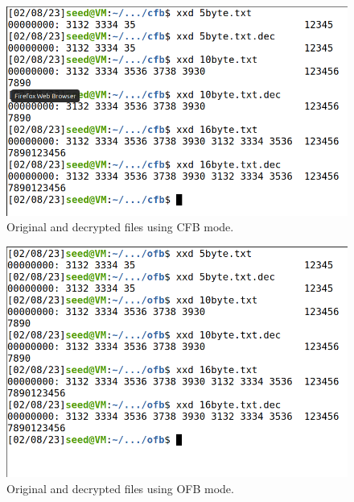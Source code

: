\begin{figure}
    \centering
    \includegraphics[height=\textheight,width=\textwidth,keepaspectratio]
    {figures/padding_cfb.png}
    \caption{Original and decrypted files using CFB mode.}\label{fig:padding_cfb}
\end{figure}

\begin{figure}
    \centering
    \includegraphics[height=\textheight,width=\textwidth,keepaspectratio]
    {figures/padding_ofb.png}
    \caption{Original and decrypted files using OFB mode.}\label{fig:padding_ofb}
\end{figure}